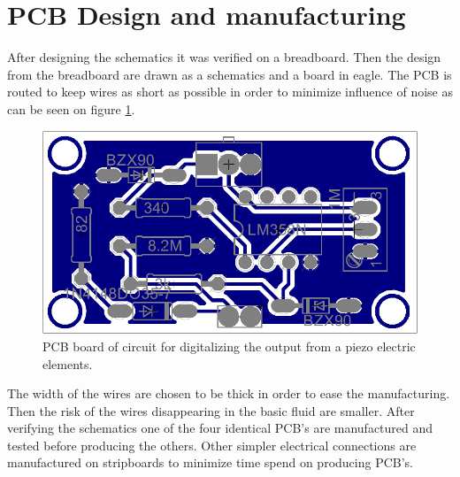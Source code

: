 \section{PCB Design and manufacturing}
After designing the schematics it was verified on a breadboard. Then the design from the breadboard are drawn as a schematics and a board in eagle.
The PCB is routed to keep wires as short as possible in order to minimize influence of noise as can be seen on figure \ref{fig:pcb}.
\begin{figure}[htb]
	\centering
	\includegraphics[width=.6\textwidth]{figures/pcb}
	\caption{PCB board of circuit for digitalizing the output from a piezo electric elements.}
	\label{fig:pcb}
\end{figure}
The width of the wires are chosen to be thick in order to ease the manufacturing. Then the risk of the wires disappearing in the basic fluid are smaller.
After verifying the schematics one of the four identical PCB's are manufactured and tested before producing the others.
Other simpler electrical connections are manufactured on stripboards to minimize time spend on producing PCB's.